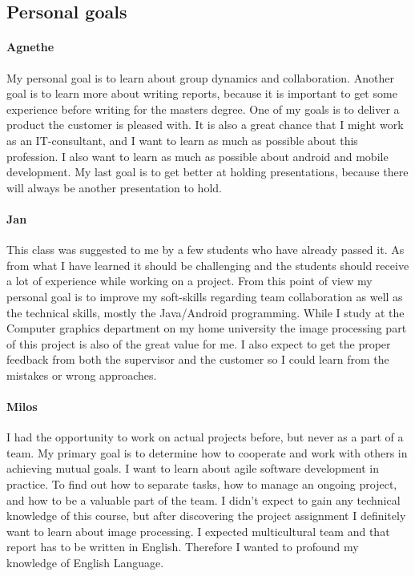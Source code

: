 \subsection{Personal goals}
\paragraph{Agnethe}

My personal goal is to learn about group dynamics and collaboration. Another goal is to learn more about writing reports, because it is important to get some experience before writing for the masters degree. One of my goals is to deliver a product the customer is pleased with. It is also a great chance that I might work as an IT-consultant, and I want to learn as much as possible about this profession. I also want to learn as much as possible about android and mobile development. My last goal is to get better at holding presentations, because there will always be another presentation to hold. 

\paragraph{Jan}

This class was suggested to me by a few students who have already passed it. As from what I have learned it should be challenging and the students should receive a lot of experience while working on a project. From this point of view my personal goal is to improve my soft-skills regarding team collaboration as well as the technical skills, mostly the Java/Android programming. While I study at the Computer graphics department on my home university the image processing part of this project is also of the great value for me. I also expect to get the proper feedback from both the supervisor and the customer so I could learn from the mistakes or wrong approaches.

\paragraph{Milos}

I had the opportunity to work on actual projects before, but never as a part of a team. 
My primary goal is to determine how to cooperate and work with others in achieving mutual goals.
I want to learn about agile software development in practice.
To find out how to separate tasks, how to manage an ongoing project, and how to be a valuable part of the team.
I didn't expect to gain any technical knowledge of this course, but after discovering the project assignment I definitely want to learn about image processing.
I expected multicultural team and that report has to be written in English.
Therefore I wanted to profound my knowledge of English Language.


